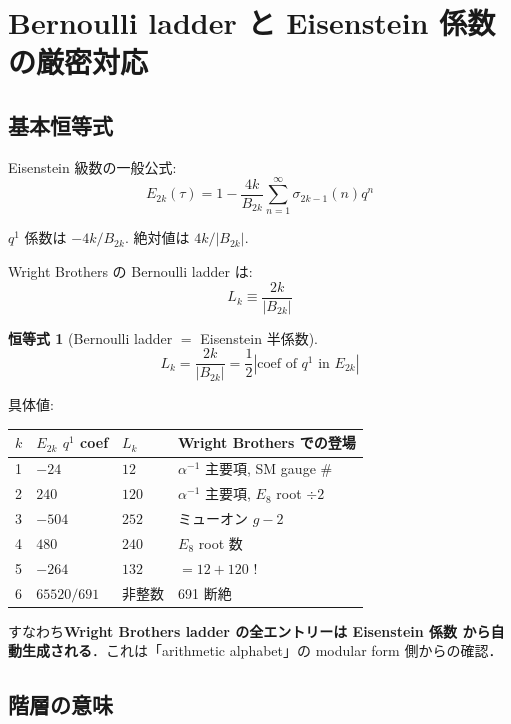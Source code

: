 \documentclass[11pt,a4paper]{article}
\newtheorem{identity}{恒等式}
\begin{document}
\section{Bernoulli ladder と Eisenstein 係数の厳密対応}

\subsection{基本恒等式}

Eisenstein 級数の一般公式:
\begin{equation}
E_{2k}(\tau) = 1 - \frac{4k}{B_{2k}}\sum_{n=1}^\infty \sigma_{2k-1}(n) q^n
\end{equation}

$q^1$ 係数は $-4k/B_{2k}$. 絶対値は $4k/|B_{2k}|$.

Wright Brothers の Bernoulli ladder は:
\begin{equation}
L_k \equiv \frac{2k}{|B_{2k}|}
\end{equation}

\begin{identity}[Bernoulli ladder $=$ Eisenstein 半係数]
\begin{equation}
L_k = \frac{2k}{|B_{2k}|} = \frac{1}{2}\left|\text{coef of }q^1\text{ in }E_{2k}\right|
\end{equation}
\end{identity}

具体値:
\begin{center}
\begin{tabular}{llll}
\toprule
$k$ & $E_{2k}$ $q^1$ coef & $L_k$ & Wright Brothers での登場 \\
\midrule
1 & $-24$ & $12$ & $\alpha^{-1}$ 主要項, SM gauge \# \\
2 & $240$ & $120$ & $\alpha^{-1}$ 主要項, $E_8$ root $\div 2$ \\
3 & $-504$ & $252$ & ミューオン $g-2$ \\
4 & $480$ & $240$ & $E_8$ root 数 \\
5 & $-264$ & $132$ & $= 12 + 120$ ! \\
6 & $65520/691$ & 非整数 & 691 断絶 \\
\bottomrule
\end{tabular}
\end{center}

すなわち\textbf{Wright Brothers ladder の全エントリーは Eisenstein 係数
から自動生成される}．これは「arithmetic alphabet」の modular
form 側からの確認．

\subsection{階層の意味}
\end{document}
